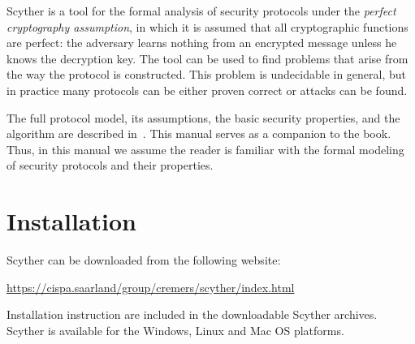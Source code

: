 \documentclass{book}
\begin{document}
Scyther is a tool for the formal analysis of security protocols under the
\emph{perfect cryptography assumption}, in which it is assumed that all
cryptographic functions are perfect: the adversary learns nothing from
an encrypted message unless he knows the decryption key. The tool can be
used to find problems that arise from the way the protocol is
constructed. This problem is undecidable in general, but in practice
many protocols can be either proven correct or attacks can be found.

The full protocol model, its assumptions, the basic security properties,
and the algorithm are described in~\cite{opsembook}. This manual serves
as a companion to the book.  Thus, in this manual we assume the
reader is familiar with the formal modeling of security protocols and
their properties.

% 

\chapter{Installation}
\label{sec:install}

Scyther can be downloaded from the following website:

\url{https://cispa.saarland/group/cremers/scyther/index.html}

\medskip

\noindent
{}
Installation instruction are included in the downloadable Scyther
archives. Scyther is available for the Windows,
Linux and Mac OS platforms.

\end{document}
